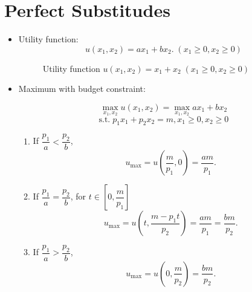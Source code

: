\documentclass[
12pt, %
a4paper, %
onecolumn, %
portrait %
]{article}
\begin{document}
\section{Perfect Substitudes} %
\begin{itemize}
\item Utility function:
	\[
	u(x_1,x_2)=ax_1+bx_2.\;(x_1\ge0,x_2\ge 0)
	\]
\begin{figure}[H]
	\centering
	\caption{Utility function $u(x_1,x_2)=x_1+x_2\;(x_1\ge0,x_2\ge 0)$}
	\label{Fig.lable}
\end{figure}	


\item Maximum with budget constraint:
    
    \[
    \max_{x_1,x_2} u(x_1,x_2)=\max_{x_1,x_2}ax_1+bx_2
    \]
    \[
    \text{s.t.}\;p_1x_1+p_2x_2=m,x_1\ge0,x_2\ge 0
    \]
    \begin{enumerate}
    \item If $\dfrac{p_1}{a}<\dfrac{p_2}{b}$,
    \[
    u_{\max}=u\left(\frac{m}{p_1},0\right)=\frac{am}{p_1}.
    \]
    \item If $\dfrac{p_1}{a}=\dfrac{p_2}{b}$, for $t\in\left[0,\dfrac{m}{p_1}\right]$
    \[
    u_{\max}=u\left(t,\frac{m-p_1t}{p_2}\right)=\frac{am}{p_1}=\frac{bm}{p_2}.
    \]
    \item If $\dfrac{p_1}{a}>\dfrac{p_2}{b}$,
    \[
    u_{\max}=u\left(0,\frac{m}{p_2}\right)=\frac{bm}{p_2}.
    \]
    \end{enumerate}


\end{itemize}
\end{document}
